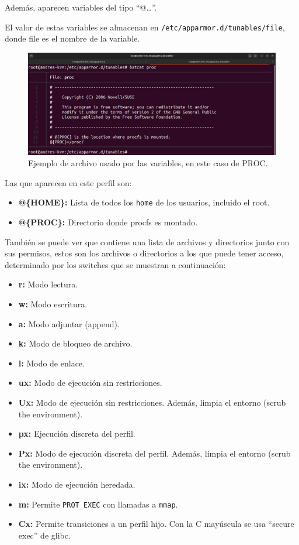 \documentclass{article}
\begin{document}
\newpage

Además, aparecen variables del tipo ``@{\dots}''.

El valor de estas variables se almacenan en \verb|/etc/apparmor.d/tunables/file|, donde file es el nombre de la variable.

\begin{figure}[H]
    \includegraphics[width=\textwidth]{imagenes/Captura desde 2022-10-18 16-25-52.png}
    \caption{Ejemplo de archivo usado por las variables, en este caso de PROC.}
\end{figure}

\bigskip

Las que aparecen en este perfil son:

\begin{itemize}
    \item \textbf{@\{HOME\}: }Lista de todos los \verb|home| de los usuarios, incluido el root.
    \item \textbf{@\{PROC\}: }Directorio donde procfs es montado.
\end{itemize}

También se puede ver que contiene una lista de archivos y directorios junto con sus permisos, estos son los archivos o directorios a los que puede tener acceso, determinado por los switches que se muestran a continuación:

\begin{itemize}
    \item \textbf{r: }Modo lectura.
    \item \textbf{w: }Modo escritura.
    \item \textbf{a: }Modo adjuntar (append).
    \item \textbf{k: }Modo de bloqueo de archivo.
    \item \textbf{l: }Modo de enlace.
    \item \textbf{ux: }Modo de ejecución sin restricciones.
    \item \textbf{Ux: }Modo de ejecución sin restricciones. Además, limpia el entorno (scrub the environment).
    \item \textbf{px: }Ejecución discreta del perfil.
    \item \textbf{Px: }Modo de ejecución discreta del perfil. Además, limpia el entorno (scrub the environment).
    \item \textbf{ix: }Modo de ejecución heredada.
    \item \textbf{m: }Permite \verb|PROT_EXEC| con llamadas a \verb|mmap|.
    \item \textbf{Cx: }Permite transiciones a un perfil hijo. Con la C mayúscula se usa ``secure exec'' de glibc.
\end{itemize}
\end{document}
